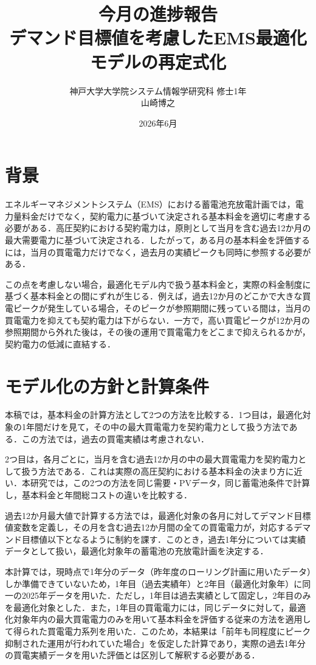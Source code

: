 \documentclass[a4paper,11pt,dvipdfmx]{jsarticle}
\title{今月の進捗報告\\[0.5em]\large デマンド目標値を考慮したEMS最適化モデルの再定式化}
\author{神戸大学大学院システム情報学研究科 修士1年\\山崎博之}
\date{2026年6月}
\begin{document}
\maketitle

\section{背景}
エネルギーマネジメントシステム（EMS）における蓄電池充放電計画では，電力量料金だけでなく，契約電力に基づいて決定される基本料金を適切に考慮する必要がある．高圧契約における契約電力は，原則として当月を含む過去12か月の最大需要電力に基づいて決定される．したがって，ある月の基本料金を評価するには，当月の買電電力だけでなく，過去月の実績ピークも同時に参照する必要がある．

この点を考慮しない場合，最適化モデル内で扱う基本料金と，実際の料金制度に基づく基本料金との間にずれが生じる．例えば，過去12か月のどこかで大きな買電ピークが発生している場合，そのピークが参照期間に残っている間は，当月の買電電力を抑えても契約電力は下がらない．一方で，高い買電ピークが12か月の参照期間から外れた後は，その後の運用で買電電力をどこまで抑えられるかが，契約電力の低減に直結する．

\section{モデル化の方針と計算条件}
本稿では，基本料金の計算方法として2つの方法を比較する．1つ目は，最適化対象の1年間だけを見て，その中の最大買電電力を契約電力として扱う方法である．この方法では，過去の買電実績は考慮されない．

2つ目は，各月ごとに，当月を含む過去12か月の中の最大買電電力を契約電力として扱う方法である．これは実際の高圧契約における基本料金の決まり方に近い．本研究では，この2つの方法を同じ需要・PVデータ，同じ蓄電池条件で計算し，基本料金と年間総コストの違いを比較する．

過去12か月最大値で計算する方法では，最適化対象の各月に対してデマンド目標値変数を定義し，その月を含む過去12か月間の全ての買電電力が，対応するデマンド目標値以下となるように制約を課す．このとき，過去1年分については実績データとして扱い，最適化対象年の蓄電池の充放電計画を決定する．

本計算では，現時点で1年分のデータ（昨年度のローリング計画に用いたデータ）しか準備できていないため，1年目（過去実績年）と2年目（最適化対象年）に同一の2025年データを用いた．ただし，1年目は過去実績として固定し，2年目のみを最適化対象とした．また，1年目の買電電力には，同じデータに対して，最適化対象年内の最大買電電力のみを用いて基本料金を評価する従来の方法を適用して得られた買電電力系列を用いた．このため，本結果は「前年も同程度にピーク抑制された運用が行われていた場合」を仮定した計算であり，実際の過去1年分の買電実績データを用いた評価とは区別して解釈する必要がある．
\end{document}
